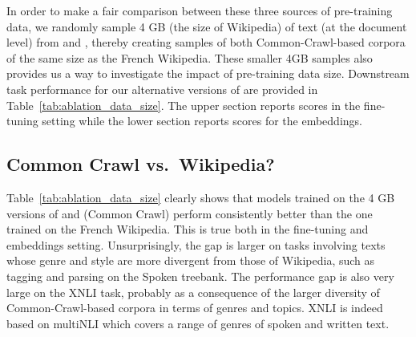 In order to make a fair comparison between these three sources of pre-training data, we randomly sample 4 GB (the size of Wikipedia) of text (at the document level) from \oscar and \ccnet, thereby creating samples of both Common-Crawl-based corpora of the same size as the French Wikipedia. These smaller 4GB samples also provides us a way to investigate the impact of pre-training data size. Downstream task performance for our alternative versions of \camembert are provided in Table~\ref{tab:ablation_data_size}.
The upper section reports scores in the fine-tuning setting while the lower section reports scores for the embeddings.

\subsection{Common Crawl vs.~Wikipedia?}
\label{subsec:homogeneityimpact}

Table~\ref{tab:ablation_data_size} clearly shows that models trained on the 4 GB versions of  and \ccnet (Common Crawl) perform consistently better than the one trained on the French Wikipedia. This is true both in the fine-tuning and embeddings setting. Unsurprisingly, the gap is larger on tasks involving texts whose genre and style are more divergent from those of Wikipedia, such as tagging and parsing on the Spoken treebank. The performance gap is also very large on the XNLI task, probably as a consequence of the larger diversity of Common-Crawl-based corpora in terms of genres and topics. XNLI is indeed based on multiNLI which covers a range of genres of spoken and written text.

